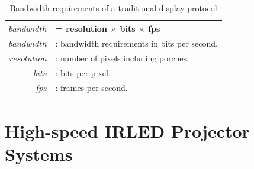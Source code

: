     \begin{table}
        \centering
        \large
        \begin{tabular}{| r l |}
            \hline
            $bandwidth$ & = resolution $\times$ bits $\times$ fps \\ \hline
            $bandwidth$ & : bandwidth requirements in bits per second. \\
            $resolution$ & : number of pixels including porches. \\
            $bits$ & : bits per pixel. \\
            $fps$ & : frames per second. \\
            \hline
        \end{tabular}
        \caption{Bandwidth requirements of a traditional display protocol}
        \label{tbl:bandwidth}
    \end{table}

\section{High-speed IRLED Projector Systems}
%

